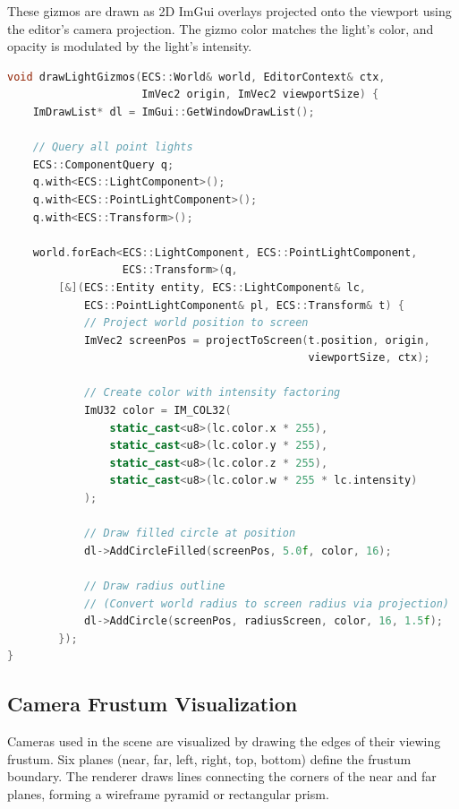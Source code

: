 These gizmos are drawn as 2D ImGui overlays projected onto the viewport using the editor's camera projection. The gizmo color matches the light's color, and opacity is modulated by the light's intensity.

\begin{lstlisting}[language=C++, caption=Light Gizmo Drawing]
void drawLightGizmos(ECS::World& world, EditorContext& ctx, 
                     ImVec2 origin, ImVec2 viewportSize) {
    ImDrawList* dl = ImGui::GetWindowDrawList();
    
    // Query all point lights
    ECS::ComponentQuery q;
    q.with<ECS::LightComponent>();
    q.with<ECS::PointLightComponent>();
    q.with<ECS::Transform>();
    
    world.forEach<ECS::LightComponent, ECS::PointLightComponent, 
                  ECS::Transform>(q, 
        [&](ECS::Entity entity, ECS::LightComponent& lc, 
            ECS::PointLightComponent& pl, ECS::Transform& t) {
            // Project world position to screen
            ImVec2 screenPos = projectToScreen(t.position, origin, 
                                               viewportSize, ctx);
            
            // Create color with intensity factoring
            ImU32 color = IM_COL32(
                static_cast<u8>(lc.color.x * 255),
                static_cast<u8>(lc.color.y * 255),
                static_cast<u8>(lc.color.z * 255),
                static_cast<u8>(lc.color.w * 255 * lc.intensity)
            );
            
            // Draw filled circle at position
            dl->AddCircleFilled(screenPos, 5.0f, color, 16);
            
            // Draw radius outline
            // (Convert world radius to screen radius via projection)
            dl->AddCircle(screenPos, radiusScreen, color, 16, 1.5f);
        });
}
\end{lstlisting}

\subsection{Camera Frustum Visualization}

Cameras used in the scene are visualized by drawing the edges of their viewing frustum. Six planes (near, far, left, right, top, bottom) define the frustum boundary. The renderer draws lines connecting the corners of the near and far planes, forming a wireframe pyramid or rectangular prism.

